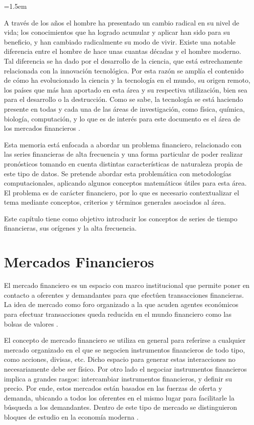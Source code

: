 \parindent=1.5em

A través de los años el hombre ha presentado un cambio radical en su nivel de vida; los conocimientos que ha logrado acumular y aplicar han sido para su beneficio,
y han cambiado radicalmente su modo de vivir. Existe una notable diferencia entre el hombre de hace unas cuantas décadas y el hombre moderno. Tal diferencia se ha
dado por el desarrollo de la ciencia, que está estrechamente relacionada con la innovación tecnológica. Por esta razón se amplía el contenido de cómo ha
evolucionado la ciencia y la tecnología en el mundo, su origen remoto, los países que más han aportado en esta área y su respectiva utilización, bien sea para
el desarrollo o la destrucción. Como se sabe, la tecnología se está haciendo presente en todas y cada una de las áreas de investigación, como física, química, 
biología, computación, y lo que es de interés para este documento es el área de los mercados financieros \cite{watsham1997quantitative}.

Esta memoria está enfocada a abordar un problema financiero, relacionado con las series financieras de alta frecuencia y una forma particular
de poder realizar pronósticos tomando en cuenta distintas características de naturaleza propia de este tipo de datos. 
Se pretende abordar esta problemática con metodologías computacionales, aplicando algunos conceptos matemáticos
útiles para esta área. El problema es de carácter financiero, por lo que es necesario contextualizar el tema mediante conceptos, criterios 
y términos generales asociados al área.

Este capítulo tiene como objetivo introducir los conceptos de series de tiempo financieras, sus orígenes y la alta frecuencia.

\section{Mercados Financieros}

El mercado financiero es un espacio con marco institucional que permite poner en contacto a oferentes y demandantes para que efectúen
transacciones financieras. La idea de mercado como foro organizado a la que acuden agentes económicos para efectuar transacciones
queda reducida en el mundo financiero como las bolsas de valores \cite{mishkin2006financial}.

El concepto de mercado financiero se utiliza en general para referirse a cualquier mercado organizado en el que se negocien instrumentos financieros
de todo tipo, como acciones, divisas, etc. Dicho espacio para generar estas interacciones no necesariamente debe ser físico. Por otro lado el negociar
instrumentos financieros implica a grandes rasgos: intercambiar instrumentos financieros, y definir su precio. Por ende, estos mercados están basados en
las fuerzas de oferta y demanda, ubicando a todos los oferentes en el mismo lugar para facilitarle la búsqueda a los demandantes. Dentro
de este tipo de mercado se distinguieron bloques de estudio en la economía moderna \cite{jensen1984theory}.

